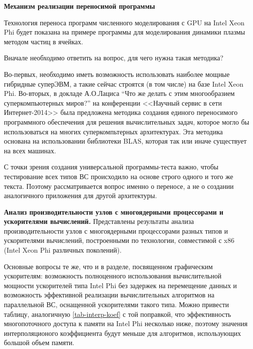 \textbf{Механизм реализации переносимой программы}

Технология переноса программ численного моделирования с GPU на Intel Xeon Phi
будет показана на примере программы для моделирования динамики плазмы методом частиц в ячейках.

Вначале необходимо ответить на вопрос, для чего нужна такая методика?

Во-первых, необходимо иметь возможность использовать наиболее мощные гибридные суперЭВМ, а такие сейчас строятся (в том числе) на базе Intel Xeon Phi. Во-вторых, в
докладе А.О.Лациса “Что же делать с этим многообразием суперкомпьютерных миров?” на конференции <<Научный сервис в сети Интернет-2014>> \cite{Lacis2014} была предложена методика создания единого переносимого программного обеспечения для решения вычислительных задач, которое могло бы использоваться на многих суперкомпьтерных архитектурах. Эта методика основана на использовании библиотеки BLAS, которая так или иначе существует на всех машинах.


С точки зрения создания универсальной программы-теста важно, чтобы тестирование всех типов ВС происходило на основе строго одного и того же текста. Поэтому рассматривается вопрос именно о переносе, а не о создании аналогичного приложения для другой архитектуры. 


\textbf{Анализ производительности узлов с многоядерными процессорами и ускорителями вычислений.} 
Представлены результаты анализа производительности узлов с многоядерными процессорами разных типов и ускорителями вычислений, построенными по технологии, совместимой с x86 (Intel Xeon Phi различных поколений).

Основные вопросы те же, что и в разделе, посвященном графическим ускорителям: возможность полноценного использования вычислительной мощности 
ускорителей типа Intel Phi без задержек на перемещение данных и возможность эффективной реализации вычислительных алгоритмов на параллельной ВС, оснащенной ускорителями такого типа. Можно привести таблицу, аналогичную \ref{tab-interp-koef} с той поправкой, что эффективность многопоточного доступа к памяти на Intel Phi несколько ниже, поэтому значения интерполяционого коэффициента будут меньше для алгоритмов, использующих большой объем памяти.



